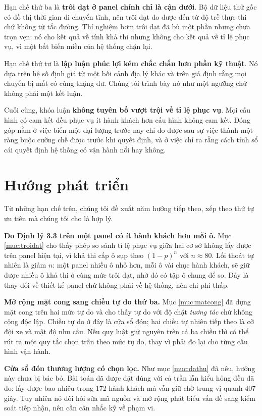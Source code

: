 Hạn chế thứ ba là \textbf{trôi dạt ở panel chính chỉ là cận dưới}. Bộ dữ liệu thử gốc có đồ thị
thời gian di chuyển tĩnh, nên trôi dạt đo được đến từ độ trễ thực thi chứ không từ tắc đường.
Thí nghiệm bơm trôi dạt đã bù một phần nhưng chưa trọn vẹn: nó cho kết quả về tính khả thi nhưng
không cho kết quả về tỉ lệ phục vụ, vì một bất biến miền của hệ thống chặn lại.

Hạn chế thứ tư là \textbf{lập luận phúc lợi kém chắc chắn hơn phần kỹ thuật}. Nó dựa trên hệ số
định giá từ một bối cảnh địa lý khác và trên giả định rằng mọi chuyến bị mất có cùng thặng dư.
Chúng tôi trình bày nó như một ngưỡng chứ không phải một kết luận.

Cuối cùng, khóa luận \textbf{không tuyên bố vượt trội về tỉ lệ phục vụ}. Mọi cấu hình có cam
kết đều phục vụ ít hành khách hơn cấu hình không cam kết. Đóng góp nằm ở việc biến một đại
lượng trước nay chỉ đo được sau sự việc thành một ràng buộc cưỡng chế được trước khi quyết
định, và ở việc chỉ ra rằng cách tính sổ cái quyết định hệ thống có vận hành nổi hay không.

\section{Hướng phát triển}

Từ những hạn chế trên, chúng tôi đề xuất năm hướng tiếp theo, xếp theo thứ tự ưu tiên mà chúng
tôi cho là hợp lý.

\textbf{Đo Định lý 3.3 trên một panel có ít hành khách hơn mỗi ô.} Mục \ref{muc:troidat} cho thấy phép so
sánh tỉ lệ phục vụ giữa hai cơ sở không lấy được trên panel hiện tại, vì khả thi cấp ô sụp theo
$(1-p)^{n}$ với $n \approx 80$. Lối thoát tự nhiên là giảm $n$: một panel nhiều ô nhỏ hơn, mỗi
ô vài chục hành khách, sẽ giữ được nhiều ô khả thi ở cùng mức trôi dạt, nhờ đó có tập ô chung
để so. Đây là thay đổi về thiết kế panel chứ không phải về hệ thống, nên chi phí thấp.

\textbf{Mở rộng mặt cong sang chiều tự do thứ ba.} Mục \ref{muc:matcong} đã dựng mặt cong trên hai mức tự
do và cho thấy tự do với độ chặt \emph{tương tác} chứ không cộng độc lập. Chiều tự do ở đây là
cửa sổ đón; hai chiều tự nhiên tiếp theo là cỡ đội xe và mật độ nhu cầu. Nếu quy luật giữ nguyên
trên cả ba chiều thì có thể rút ra một quy tắc chọn trần theo mức tự do, thay vì phải đo lại cho
từng cấu hình vận hành.

\textbf{Cửa sổ đón thương lượng có chọn lọc.} Như mục \ref{muc:dathu} đã nêu, hướng này chưa bị bác bỏ. Bài
toán đã được đặt đúng với cả trần lẫn kiểu hỏng đều đã đo: lấy được bao nhiêu trong 172 hành
khách mà vẫn giữ chờ trung vị quanh 407 giây. Tuy nhiên nó đòi hỏi sửa mã nguồn và mở rộng phát
biểu vấn đề sang kiểm soát tiếp nhận, nên cần cân nhắc kỹ về phạm vi.

